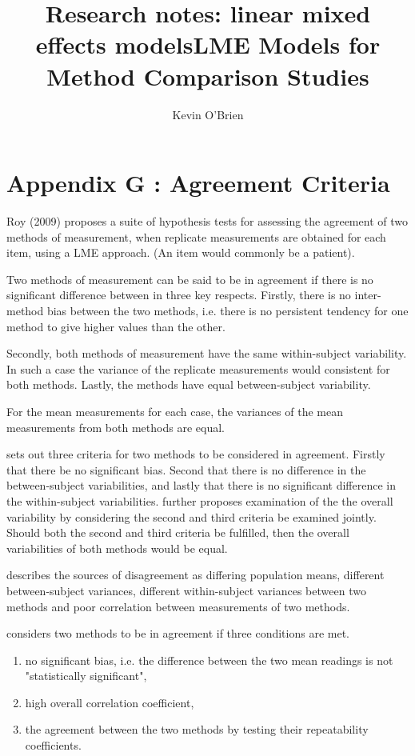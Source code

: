 \documentclass[12pt, a4paper]{report}
\title{Research notes: linear mixed effects models}
\author{ } \date{ }
\theoremstyle{plain}
\theoremstyle{definition}
\theoremstyle{remark}
\begin{document}
\author{Kevin O'Brien}
\title{LME Models for Method Comparison Studies}

\chapter{Appendix G : Agreement Criteria}




Roy (2009) proposes a suite of hypothesis tests for assessing the agreement of two methods of measurement, when replicate measurements are obtained for each item, using a LME approach. (An item would commonly be a patient). 

Two methods of measurement can be said to be in agreement if there is no significant difference between in three key respects. Firstly, there is no inter-method bias between the two methods, i.e. there is no persistent tendency for one method to give higher values than the other.

Secondly, both methods of measurement have the same  within-subject variability. In such a case the variance of the replicate measurements would consistent for both methods. Lastly, the methods have equal between-subject variability. 

For the mean measurements for each case, the variances of the mean measurements from both methods are equal.

\citet{ARoy2009} sets out three criteria for two methods to be considered in agreement. Firstly that there be no significant bias. Second that there is no difference in the between-subject variabilities, and lastly that there is no significant difference in the within-subject variabilities. \citet{ARoy2009} further proposes examination of the the overall variability by considering the second and third criteria be examined jointly. Should both the second and third criteria be fulfilled, then the overall variabilities of both methods would be equal.

\citet{Barnhart} describes the sources of disagreement as differing population means, different between-subject variances, different within-subject variances between two methods and poor correlation between measurements of two methods.

\citet{ARoy2009} considers two methods to be in agreement if three conditions are met.

\begin{enumerate}
\item no significant bias, i.e. the difference between the two
mean readings is not "statistically significant",

\item high overall correlation coefficient,

\item the agreement between the two methods by testing their
repeatability coefficients.

\end{enumerate}
\end{document}
